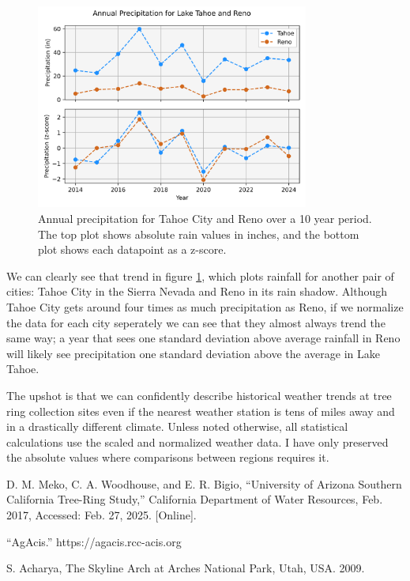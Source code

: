 \documentclass[]{article}
\begin{document}
\begin{figure}
	\centering
	\includegraphics[width=0.8\textwidth]{renotahoe.png}
	\caption{Annual precipitation for Tahoe City and Reno over a 10 year period. The top plot shows absolute rain values in inches, and the bottom plot shows each datapoint as a z-score.}
	\label{fig:reno_tahoe}
\end{figure}
We can clearly see that trend in figure \ref{fig:reno_tahoe}, which plots rainfall for another pair of cities: Tahoe City in the Sierra Nevada and Reno in its rain shadow. Although Tahoe City gets around four times as much precipitation as Reno, if we normalize the data for each city seperately we can see that they almost always trend the same way; a year that sees one standard deviation above average rainfall in Reno will likely see precipitation one standard deviation above the average in Lake Tahoe.

The upshot is that we can confidently describe historical weather trends at tree ring collection sites even if the nearest weather station is tens of miles away and in a drastically different climate. Unless noted otherwise, all statistical calculations use the scaled and normalized weather data. I have only preserved the absolute values where comparisons between regions requires it.






\begin{thebibliography}{9}
	D. M. Meko, C. A. Woodhouse, and E. R. Bigio, “University of Arizona
	Southern California Tree-Ring Study,” California Department of Water Resources, Feb. 2017, Accessed: Feb. 27, 2025. [Online].
	
	“AgAcis.” https://agacis.rcc-acis.org
	
	S. Acharya, The Skyline Arch at Arches National Park, Utah, USA. 2009.
\end{thebibliography}
\end{document}
